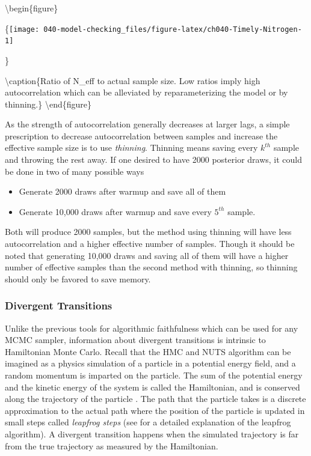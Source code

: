 \documentclass[11pt, oneside, openany]{scrbook}
\providecommand{\tightlist}{%
  \setlength{\itemsep}{0pt}\setlength{\parskip}{0pt}}
\begin{document}
\textbackslash begin\{figure\}

\{\centering \texttt{[image: 040-model-checking\_files/figure-latex/ch040-Timely-Nitrogen-1]}

\}

\textbackslash caption\{Ratio of N\_eff to actual sample size. Low ratios imply high autocorrelation which can be alleviated by reparameterizing the model or by thinning.\}\label{fig:ch040-Timely-Nitrogen}
\textbackslash end\{figure\}

As the strength of autocorrelation generally decreases at larger lags, a simple prescription to decrease autocorrelation between samples and increase the effective sample size is to use \emph{thinning}. Thinning means saving every \(k^{th}\) sample and throwing the rest away. If one desired to have 2000 posterior draws, it could be done in two of many possible ways

\begin{itemize}
\tightlist
\item
  Generate 2000 draws after warmup and save all of them
\item
  Generate 10,000 draws after warmup and save every \(5^{th}\) sample.
\end{itemize}

Both will produce 2000 samples, but the method using thinning will have less autocorrelation and a higher effective number of samples. Though it should be noted that generating 10,000 draws and saving all of them will have a higher number of effective samples than the second method with thinning, so thinning should only be favored to save memory.

\hypertarget{divergent-transitions}{%
\subsubsection{Divergent Transitions}\label{divergent-transitions}}

Unlike the previous tools for algorithmic faithfulness which can be used for any MCMC sampler, information about divergent transitions is intrinsic to Hamiltonian Monte Carlo. Recall that the HMC and NUTS algorithm can be imagined as a physics simulation of a particle in a potential energy field, and a random momentum is imparted on the particle. The sum of the potential energy and the kinetic energy of the system is called the Hamiltonian, and is conserved along the trajectory of the particle \citep{stanref}. The path that the particle takes is a discrete approximation to the actual path where the position of the particle is updated in small steps called \emph{leapfrog steps} (see \citet{leimkuhler2004simulating} for a detailed explanation of the leapfrog algorithm). A divergent transition happens when the simulated trajectory is far from the true trajectory as measured by the Hamiltonian.
\end{document}
